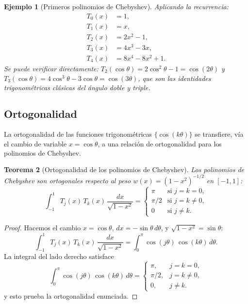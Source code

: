 \documentclass[a4paper,11pt]{report}
\newtheorem{theorem}{Teorema}[chapter]
\newtheorem{example}[theorem]{Ejemplo}
\begin{document}
\begin{example}[Primeros polinomios de Chebyshev]
Aplicando la recurrencia:
\begin{align*}
T_0(x) &= 1, \\
T_1(x) &= x, \\
T_2(x) &= 2x^2 - 1, \\
T_3(x) &= 4x^3 - 3x, \\
T_4(x) &= 8x^4 - 8x^2 + 1.
\end{align*}
Se puede verificar directamente: $T_2(\cos\theta) = 2\cos^2\theta - 1 = \cos(2\theta)$ y $T_3(\cos\theta) = 4\cos^3\theta - 3\cos\theta = \cos(3\theta)$, que son las identidades trigonométricas clásicas del ángulo doble y triple.
\end{example}

\subsection{Ortogonalidad}

La ortogonalidad de las funciones trigonométricas $\{\cos(k\theta)\}$ se transfiere, vía el cambio de variable $x = \cos\theta$, a una relación de ortogonalidad para los polinomios de Chebyshev.

\begin{theorem}[Ortogonalidad de los polinomios de Chebyshev]\label{thm:ortogonalidad_chebyshev}
Los polinomios de Chebyshev son ortogonales respecto al peso $w(x) = (1-x^2)^{-1/2}$ en $[-1,1]$:
\[
\int_{-1}^{1} T_j(x)\,T_k(x)\, \frac{dx}{\sqrt{1-x^2}} = \begin{cases} \pi & \text{si } j = k = 0, \\ \pi/2 & \text{si } j = k \neq 0, \\ 0 & \text{si } j \neq k. \end{cases}
\]
\end{theorem}

\begin{proof}
Hacemos el cambio $x = \cos\theta$, $dx = -\sin\theta\,d\theta$, y $\sqrt{1-x^2} = \sin\theta$:
\[
\int_{-1}^{1} T_j(x)\,T_k(x)\,\frac{dx}{\sqrt{1-x^2}} = \int_0^{\pi} \cos(j\theta)\,\cos(k\theta)\,d\theta.
\]
La integral del lado derecho satisface
\begin{equation}\label{eq:ortog_cos}
\int_0^{\pi} \cos(j\theta)\,\cos(k\theta)\,d\theta=
\begin{cases}
\pi, & j=k=0,\\
\pi/2, & j=k\neq 0,\\
0, & j\neq k.
\end{cases}
\end{equation}
y esto prueba la ortogonalidad enunciada.
\end{proof}
\end{document}
